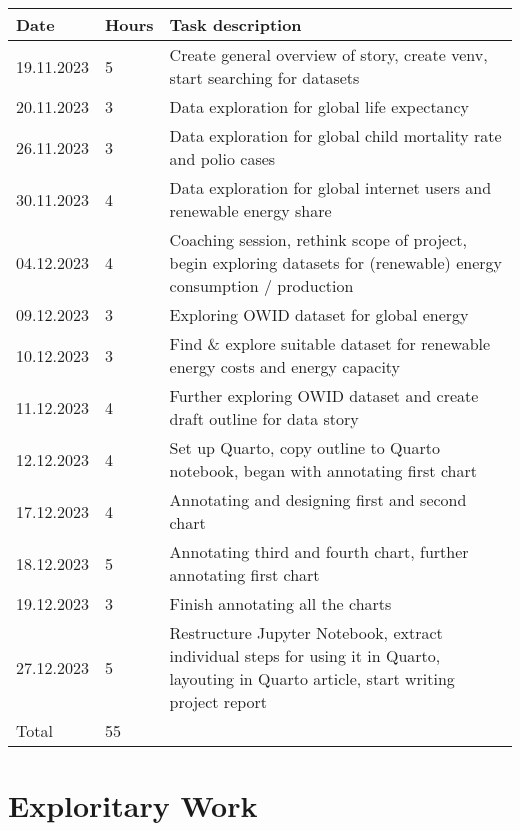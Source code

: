 \documentclass{article}
\begin{document}
\begin{table}[!ht]
    \centering
    \begin{tabular}{|p{2cm}|p{1cm}|p{7.5cm}|}
    \hline
        \textbf{Date} & \textbf{Hours} & \textbf{Task description} \\ \hline
        19.11.2023 & 5 & Create general overview of story, create venv, start searching for datasets \\ \hline
        20.11.2023 & 3 & Data exploration for global life expectancy \\ \hline
        26.11.2023 & 3 & Data exploration for global child mortality rate and polio cases \\ \hline
        30.11.2023 & 4 & Data exploration for global internet users and renewable energy share \\ \hline
        04.12.2023 & 4 & Coaching session, rethink scope of project, begin exploring datasets for (renewable) energy consumption / production \\ \hline
        09.12.2023 & 3 & Exploring OWID dataset for global energy \\ \hline
        10.12.2023 & 3 & Find \& explore suitable dataset for renewable energy costs and energy capacity \\ \hline
        11.12.2023 & 4 & Further exploring OWID dataset and create draft outline for data story \\ \hline
        12.12.2023 & 4 & Set up Quarto, copy outline to Quarto notebook, began with annotating first chart \\ \hline
        17.12.2023 & 4 & Annotating and designing first and second chart \\ \hline
        18.12.2023 & 5 & Annotating third and fourth chart, further annotating first chart \\ \hline
        19.12.2023 & 3 & Finish annotating all the charts \\ \hline
        27.12.2023 & 5 & Restructure Jupyter Notebook, extract individual steps for using it in Quarto, layouting in Quarto article, start writing project report \\ \hline
        \hline
        Total & 55 &  \\ \hline
    \end{tabular}
\end{table}

\newpage

\section{Exploritary Work}
\end{document}
